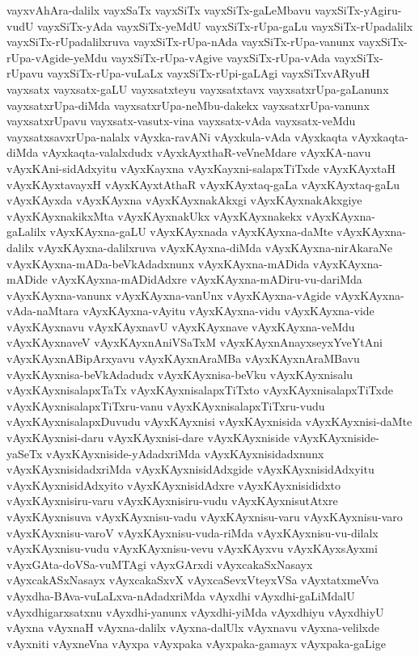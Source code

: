 {vayxvAhAra-dalilx
vayxSaTx
vayxSiTx
vayxSiTx-gaLeMbavu
vayxSiTx-yAgiru-vudU
vayxSiTx-yAda
vayxSiTx-yeMdU
vayxSiTx-rUpa-gaLu
vayxSiTx-rUpadalilx
vayxSiTx-rUpadalilxruva
vayxSiTx-rUpa-nAda
vayxSiTx-rUpa-vanunx
vayxSiTx-rUpa-vAgide-yeMdu
vayxSiTx-rUpa-vAgive
vayxSiTx-rUpa-vAda
vayxSiTx-rUpavu
vayxSiTx-rUpa-vuLaLx
vayxSiTx-rUpi-gaLAgi
vayxSiTxvARyuH
vayxsatx
vayxsatx-gaLU
vayxsatxteyu
vayxsatxtavx
vayxsatxrUpa-gaLanunx
vayxsatxrUpa-diMda
vayxsatxrUpa-neMbu-dakekx
vayxsatxrUpa-vanunx
vayxsatxrUpavu
vayxsatx-vasutx-vina
vayxsatx-vAda
vayxsatx-veMdu
vayxsatxsavxrUpa-nalalx
vAyxka-ravANi
vAyxkula-vAda
vAyxkaqta
vAyxkaqta-diMda
vAyxkaqta-valalxdudx
vAyxkAyxthaR-veVneMdare
vAyxKA-navu
vAyxKAni-sidAdxyitu
vAyxKayxna
vAyxKayxni-salapxTiTxde
vAyxKAyxtaH
vAyxKAyxtavayxH
vAyxKAyxtAthaR
vAyxKAyxtaq-gaLa
vAyxKAyxtaq-gaLu
vAyxKAyxda
vAyxKAyxna
vAyxKAyxnakAkxgi
vAyxKAyxnakAkxgiye
vAyxKAyxnakikxMta
vAyxKAyxnakUkx
vAyxKAyxnakekx
vAyxKAyxna-gaLalilx
vAyxKAyxna-gaLU
vAyxKAyxnada
vAyxKAyxna-daMte
vAyxKAyxna-dalilx
vAyxKAyxna-dalilxruva
vAyxKAyxna-diMda
vAyxKAyxna-nirAkaraNe
vAyxKAyxna-mADa-beVkAdadxnunx
vAyxKAyxna-mADida
vAyxKAyxna-mADide
vAyxKAyxna-mADidAdxre
vAyxKAyxna-mADiru-vu-dariMda
vAyxKAyxna-vanunx
vAyxKAyxna-vanUnx
vAyxKAyxna-vAgide
vAyxKAyxna-vAda-naMtara
vAyxKAyxna-vAyitu
vAyxKAyxna-vidu
vAyxKAyxna-vide
vAyxKAyxnavu
vAyxKAyxnavU
vAyxKAyxnave
vAyxKAyxna-veMdu
vAyxKAyxnaveV
vAyxKAyxnAniVSaTxM
vAyxKAyxnAnayxseyxYveYtAni
vAyxKAyxnABipArxyavu
vAyxKAyxnAraMBa
vAyxKAyxnAraMBavu
vAyxKAyxnisa-beVkAdadudx
vAyxKAyxnisa-beVku
vAyxKAyxnisalu
vAyxKAyxnisalapxTaTx
vAyxKAyxnisalapxTiTxto
vAyxKAyxnisalapxTiTxde
vAyxKAyxnisalapxTiTxru-vanu
vAyxKAyxnisalapxTiTxru-vudu
vAyxKAyxnisalapxDuvudu
vAyxKAyxnisi
vAyxKAyxnisida
vAyxKAyxnisi-daMte
vAyxKAyxnisi-daru
vAyxKAyxnisi-dare
vAyxKAyxniside
vAyxKAyxniside-yaSeTx
vAyxKAyxniside-yAdadxriMda
vAyxKAyxnisidadxnunx
vAyxKAyxnisidadxriMda
vAyxKAyxnisidAdxgide
vAyxKAyxnisidAdxyitu
vAyxKAyxnisidAdxyito
vAyxKAyxnisidAdxre
vAyxKAyxnisididxto
vAyxKAyxnisiru-varu
vAyxKAyxnisiru-vudu
vAyxKAyxnisutAtxre
vAyxKAyxnisuva
vAyxKAyxnisu-vadu
vAyxKAyxnisu-varu
vAyxKAyxnisu-varo
vAyxKAyxnisu-varoV
vAyxKAyxnisu-vuda-riMda
vAyxKAyxnisu-vu-dilalx
vAyxKAyxnisu-vudu
vAyxKAyxnisu-vevu
vAyxKAyxvu
vAyxKAyxsAyxmi
vAyxGAta-doVSa-vuMTAgi
vAyxGArxdi
vAyxcakaSxNasayx
vAyxcakASxNasayx
vAyxcakaSxvX
vAyxcaSevxVteyxVSa
vAyxtatxmeVva
vAyxdha-BAva-vuLaLxva-nAdadxriMda
vAyxdhi
vAyxdhi-gaLiMdalU
vAyxdhigarxsatxnu
vAyxdhi-yanunx
vAyxdhi-yiMda
vAyxdhiyu
vAyxdhiyU
vAyxna
vAyxnaH
vAyxna-dalilx
vAyxna-dalUlx
vAyxnavu
vAyxna-velilxde
vAyxniti
vAyxneVna
vAyxpa
vAyxpaka
vAyxpaka-gamayx
vAyxpaka-gaLige
}
